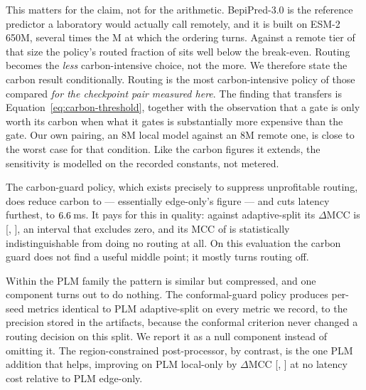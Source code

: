 This matters for the claim, not for the arithmetic. BepiPred-3.0 is the
reference predictor a laboratory would actually call remotely, and it is built
on ESM-2 650M, several times the \ScaleCrossoverParams{}M at which the
ordering turns. Against a remote tier of that
size the policy's routed fraction of \AdaptiveSplitRouteRate{} sits well below
the break-even. Routing becomes the \emph{less} carbon-intensive choice,
not the more. We therefore state the carbon result conditionally. Routing is
the most carbon-intensive policy of those compared \emph{for the checkpoint
pair measured here}. The finding that transfers is
Equation~\ref{eq:carbon-threshold}, together with the observation that a
gate is only worth its carbon when what it gates is substantially more
expensive than the gate. Our own pairing, an \(8\)M local model against an
\(8\)M remote one, is close to the worst case for that condition. Like the
carbon figures it extends, the sensitivity is modelled on the recorded
constants, not metered.

The carbon-guard policy, which exists precisely to suppress unprofitable
routing, does reduce carbon to \CarbonGuardCarbon{} --- essentially
edge-only's figure --- and cuts latency furthest, to
\(6.6{}\,\)ms. It pays for this in quality: against
adaptive-split its \(\Delta\)MCC is \DCgVsAsMcc{}
[\DCgVsAsMccLo{}, \DCgVsAsMccHi{}], an interval that excludes zero, and its MCC
of \CarbonGuardMcc{} is statistically indistinguishable from doing no routing at
all. On this evaluation the carbon guard does not find a useful middle point; it
mostly turns routing off.

Within the PLM family the pattern is similar but compressed, and one component
turns out to do nothing. The conformal-guard policy produces per-seed metrics
identical to PLM adaptive-split on every metric we record, to the precision
stored in the artifacts, because the conformal criterion never changed a
routing decision on this split. We report it as a null component instead of
omitting it. The region-constrained post-processor, by contrast, is the one PLM addition
that helps, improving on PLM local-only by \(\Delta\)MCC \DPreVsPloMcc{}
[\DPreVsPloMccLo{}, \DPreVsPloMccHi{}] at no latency cost relative to PLM
edge-only.

